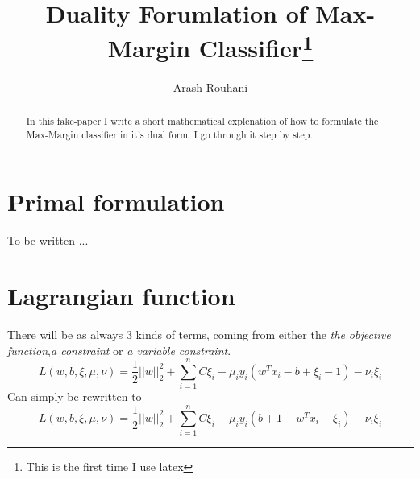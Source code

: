 \documentclass[a4paper,11pt]{article}
\title{Duality Forumlation of Max-Margin Classifier\footnote{This is the first time I use latex}}
\author{Arash Rouhani}
\begin{document}
\maketitle

\begin{abstract}
In this fake-paper I write a short mathematical explenation
of how to formulate the Max-Margin classifier in it's dual form.
I go through it step by step. 

\end{abstract}

\section{Primal formulation}
To be written ...
\section{Lagrangian function}
There will be as always 3 kinds of terms, coming from either the \textit{the objective function},\textit{a constraint} or \textit{a variable constraint}.
\begin{equation}
L(w, b, \xi, \mu, \nu) = \frac{1}{2} ||w||^2_2 + \sum\limits_{i=1}^n {C\xi_i - \mu_iy_i(w^Tx_i - b + \xi_i - 1) - \nu_i\xi_i}
\end{equation}
Can simply be rewritten to
\begin{equation}
L(w, b, \xi, \mu, \nu) = \frac{1}{2} ||w||^2_2 + \sum\limits_{i=1}^n {C\xi_i + \mu_iy_i(b + 1 - w^Tx_i - \xi_i) - \nu_i\xi_i}
\end{equation}
\end{document}
